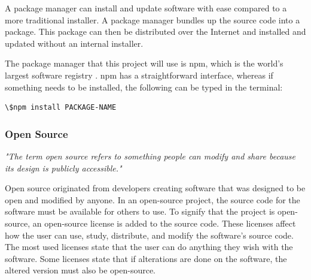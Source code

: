 A package manager can install and update software with ease compared to a more traditional installer. A package manager bundles up the source code into a package. This package can then be distributed over the Internet and installed and updated without an internal installer. 

The package manager that this project will use is \acrfull{npm}, which is the world's largest software registry \cite{NpmNpmDocs}.
\acrshort{npm} has a straightforward interface, whereas if something needs to be installed, the following can be typed in the terminal: 

\begin{lstlisting}[style=htmlcssjs]
\$npm install PACKAGE-NAME
\end{lstlisting}

\subsubsection{Open Source}%
\label{ssub:Open Source}

\textit{"The term open source refers to something people can modify and share because its design is publicly accessible."} \cite{WhatOpenSource}

Open source originated from developers creating software that was designed to be open and modified by anyone. In an open-source project, the source code for the software must be available for others to use. To signify that the project is open-source, an open-source license is added to the source code. These licenses affect how the user can use, study, distribute, and modify the software's source code. The most used licenses state that the user can do anything they wish with the software. Some licenses state that if alterations are done on the software, the altered version must also be open-source. 








